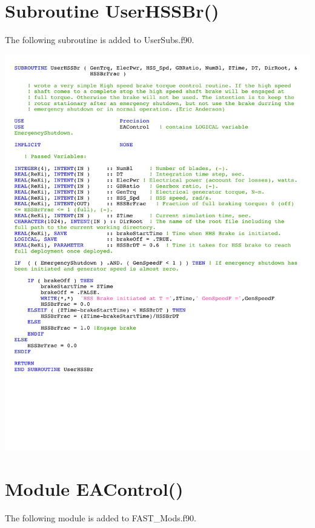 \section{Subroutine UserHSSBr()} \label{sectionD-4}
The following subroutine is added to UserSubs.f90.

\noindent
\includegraphics[width=\linewidth]{Figures/AppendixDFigures/figD-4.pdf}

\section{Module EAControl()} \label{sectionD-5}
The following module is added to FAST\_Mods.f90.

